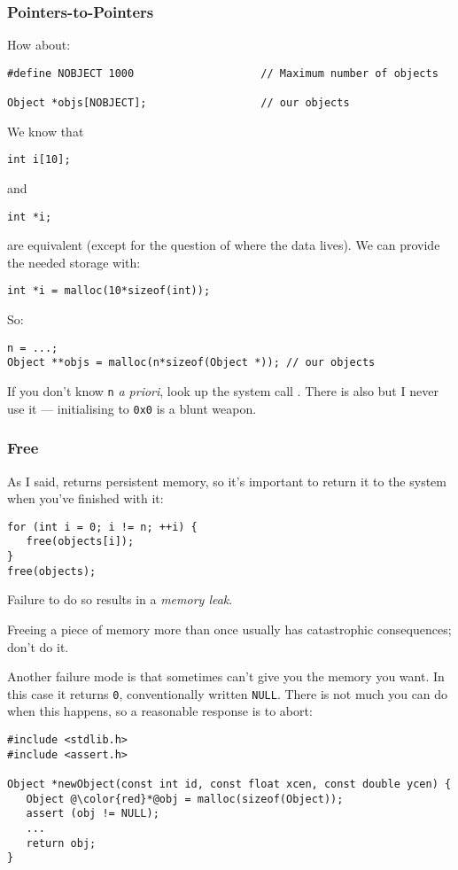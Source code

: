 \documentclass[10pt, t]{beamer}
\begin{document}
\begin{frame}[fragile]
\frametitle{Pointers-to-Pointers}
\label{sec-5_1_16}

How about:
\begin{verbatim}
#define NOBJECT 1000                    // Maximum number of objects

Object *objs[NOBJECT];                  // our objects
\end{verbatim}
\pause

We know that
\begin{verbatim}
int i[10];
\end{verbatim}
and
\begin{verbatim}
int *i;
\end{verbatim}
are equivalent (except for the question of where the data lives).\pause{}
We can provide the needed storage with:
\begin{verbatim}
int *i = malloc(10*sizeof(int));
\end{verbatim}

\pause
So:
\begin{verbatim}
n = ...;
Object **objs = malloc(n*sizeof(Object *)); // our objects
\end{verbatim}
\pause
If you don't know \texttt{n} \emph{a priori}, look up the system call .
\pause
There is also  but I never use it --- initialising to \texttt{0x0} is a blunt weapon.
\end{frame}
\begin{frame}[fragile]
\frametitle{Free}
\label{sec-5_1_17}

As I said,  returns persistent memory, so it's important to return it to the system
when you've finished with it:
\begin{verbatim}
for (int i = 0; i != n; ++i) {
   free(objects[i]);
}
free(objects);
\end{verbatim}
\pause Failure to do so results in a \emph{memory leak}.

\pause
Freeing a piece of memory more than once usually has catastrophic consequences; don't do it.

\pause
Another failure mode is that sometimes  can't give you the memory you want.  In this case it
returns \texttt{0}, conventionally written \texttt{NULL}.  There is not much you can do when this happens, so a reasonable
response is to abort:
\begin{verbatim}
#include <stdlib.h>
#include <assert.h>

Object *newObject(const int id, const float xcen, const double ycen) {
   Object @\color{red}*@obj = malloc(sizeof(Object));
   assert (obj != NULL);
   ...
   return obj;
}
\end{verbatim}
\end{frame}
\end{document}
